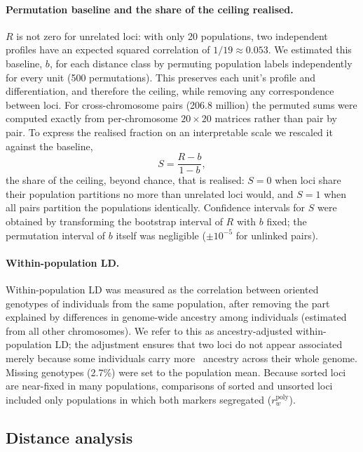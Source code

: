 \paragraph{Permutation baseline and the share of the ceiling realised.} $R$ is not zero for unrelated loci: with only 20 populations, two independent profiles have an expected squared correlation of $1/19\approx0.053$. We estimated this baseline, $b$, for each distance class by permuting population labels independently for every unit (500 permutations). This preserves each unit's profile and differentiation, and therefore the ceiling, while removing any correspondence between loci. For cross-chromosome pairs (206.8 million) the permuted sums were computed exactly from per-chromosome $20\times20$ matrices rather than pair by pair. To express the realised fraction on an interpretable scale we rescaled it against the baseline,
\begin{equation}
S=\frac{R-b}{1-b},
\label{eq:share}
\end{equation}
the share of the ceiling, beyond chance, that is realised: $S=0$ when loci share their population partitions no more than unrelated loci would, and $S=1$ when all pairs partition the populations identically. Confidence intervals for $S$ were obtained by transforming the bootstrap interval of $R$ with $b$ fixed; the permutation interval of $b$ itself was negligible ($\pm10^{-5}$ for unlinked pairs).

\paragraph{Within-population LD.} Within-population LD was measured as the correlation between oriented genotypes of individuals from the same population, after removing the part explained by differences in genome-wide ancestry among individuals (estimated from all other chromosomes). We refer to this as ancestry-adjusted within-population LD; the adjustment ensures that two loci do not appear associated merely because some individuals carry more \Fa\ ancestry across their whole genome. Missing genotypes (2.7\%) were set to the population mean. Because sorted loci are near-fixed in many populations, comparisons of sorted and unsorted loci included only populations in which both markers segregated ($r_w^{\mathrm{poly}}$).

\subsection{Distance analysis}

